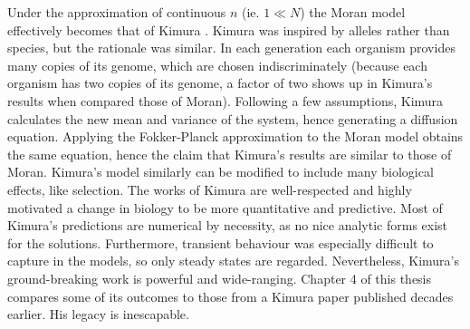 \documentclass[a4paper,11pt]{article}
\numberwithin{equation}{section} %
\begin{document}
Under the approximation of continuous $n$ (ie. $1\ll N$) the Moran model effectively becomes that of Kimura \cite{Kimura1983}. 
Kimura was inspired by alleles rather than species, but the rationale was similar. 
In each generation each organism provides many copies of its genome, which are chosen indiscriminately (because each organism has two copies of its genome, a factor of two shows up in Kimura's results when compared those of Moran). 
Following a few assumptions, Kimura calculates the new mean and variance of the system, hence generating a diffusion equation. 
Applying the Fokker-Planck approximation to the Moran model obtains the same equation, hence the claim that Kimura's results are similar to those of Moran. 
Kimura's model similarly can be modified to include many biological effects, like selection. 
The works of Kimura are well-respected and highly motivated a change in biology to be more quantitative and predictive. 
Most of Kimura's predictions are numerical by necessity, as no nice analytic forms exist for the solutions. 
Furthermore, transient behaviour was especially difficult to capture in the models, so only steady states are regarded. 
Nevertheless, Kimura's ground-breaking work is powerful and wide-ranging. 
Chapter 4 of this thesis compares some of its outcomes to those from a Kimura paper published decades earlier. 
His legacy is inescapable. 
\end{document}
